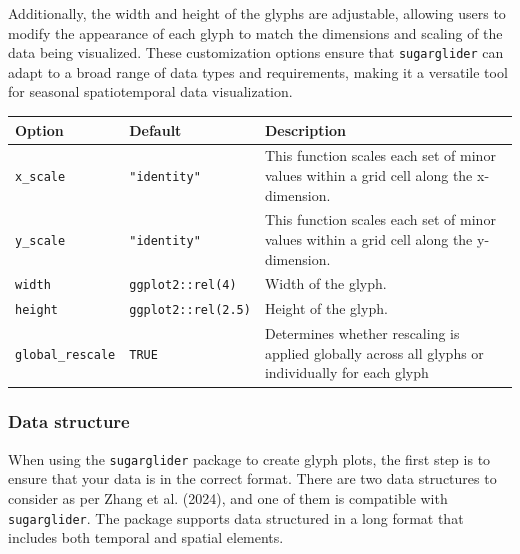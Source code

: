 Additionally, the width and height of the glyphs are adjustable, allowing users to modify the appearance of each glyph to match the dimensions and scaling of the data being visualized. These customization options ensure that \texttt{sugarglider} can adapt to a broad range of data types and requirements, making it a versatile tool for seasonal spatiotemporal data visualization.

\begin{longtable}[]{@{}
  >{\raggedright\arraybackslash}p{}
  >{\raggedright\arraybackslash}p{}
  >{\raggedright\arraybackslash}p{}@{}}
\toprule\noalign{}
\begin{minipage}[b]{\linewidth}\raggedright
Option
\end{minipage} & \begin{minipage}[b]{\linewidth}\raggedright
Default
\end{minipage} & \begin{minipage}[b]{\linewidth}\raggedright
Description
\end{minipage} \\
\midrule\noalign{}
\endhead
\bottomrule\noalign{}
\endlastfoot
\texttt{x\_scale} & \texttt{"identity"} & This function scales each set of minor values within a grid cell along the x-dimension. \\
\texttt{y\_scale} & \texttt{"identity"} & This function scales each set of minor values within a grid cell along the y-dimension. \\
\texttt{width} & \texttt{ggplot2::rel(4)} & Width of the glyph. \\
\texttt{height} & \texttt{ggplot2::rel(2.5)} & Height of the glyph. \\
\texttt{global\_rescale} & \texttt{TRUE} & Determines whether rescaling is applied globally across all glyphs or individually for each glyph \\
\end{longtable}

\subsubsection{Data structure}\label{data-structure}

When using the \texttt{sugarglider} package to create glyph plots, the first step is to ensure that your data is in the correct format. There are two data structures to consider as per Zhang et al. (2024), and one of them is compatible with \texttt{sugarglider}. The package supports data structured in a long format that includes both temporal and spatial elements.

